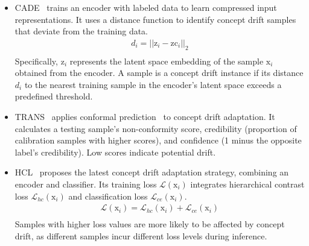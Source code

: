\documentclass[lettersize,journal]{IEEEtran}
\begin{document}
\begin{itemize}[leftmargin=0.35cm]

\item CADE~\cite{2021-Usenix-CDAE} trains an encoder with labeled data to learn compressed input representations. 
It uses a distance function to identify concept drift samples that deviate from the training data.
\begin{equation}
	\begin{aligned}
		d_{i} = ||\bm{\mathrm{z}}_{i}-\bm{\mathrm{zc}}_{i}||_{2} \\
	\end{aligned}
	\label{CADE}
\end{equation}
Specifically, $\bm{\mathrm{z}}_{i}$ represents the latent space embedding of the sample $\bm{\mathrm{x}}_{i}$ obtained from the encoder. 
A sample is a concept drift instance if its distance $d_{i}$ to the nearest training sample in the encoder’s latent space exceeds a predefined threshold.
\item TRANS~\cite{2022-SP-Trancending}
applies conformal prediction~\cite{2005-high-cite-Algorithmic-learning-in-a-random-world} to concept drift adaptation.
It calculates a testing sample’s non-conformity score, credibility (proportion of calibration samples with higher scores), and confidence (1 minus the opposite label’s credibility). 
Low scores indicate potential drift.
\item HCL~\cite{2023-Usenix-chenyizhen}
proposes the latest concept drift adaptation strategy, combining an encoder and classifier. 
Its training loss $\mathcal{L}(\bm{\mathrm{x}}_{i})$ integrates hierarchical contrast loss $\mathcal{L}_{hc}(\bm{\mathrm{x}}_{i})$ and classification loss $\mathcal{L}_{ce}(\bm{\mathrm{x}}_{i})$.
\begin{equation}
	\begin{aligned}
		\mathcal{L}(\bm{\mathrm{x}}_{i}) = \mathcal{L}_{hc}(\bm{\mathrm{x}}_{i}) + \mathcal{L}_{ce}(\bm{\mathrm{x}}_{i}) \\
	\end{aligned}
	\label{CADE}
\end{equation}
Samples with higher loss values are more likely to be affected by concept drift, as different samples incur different loss levels during inference.

\end{itemize}
\end{document}

